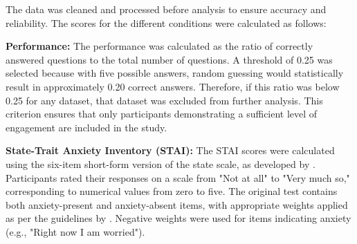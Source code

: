 The data was cleaned and processed before analysis to ensure accuracy and reliability. The scores for the different conditions were calculated as follows:

\begin{APAitemize}
\item \textbf{Performance:} The performance was calculated as the ratio of correctly answered questions to the total number of questions. A threshold of 0.25 was selected because with five possible answers, random guessing would statistically result in approximately 0.20 correct answers. Therefore, if this ratio was below 0.25 for any dataset, that dataset was excluded from further analysis. This criterion ensures that only participants demonstrating a sufficient level of engagement are included in the study.
\item \textbf{State-Trait Anxiety Inventory (STAI):} The STAI scores were calculated using the six-item short-form version of the state scale, as developed by \textcite{marteauDevelopmentSixitemShortform1992}. Participants rated their responses on a scale from "Not at all" to "Very much so," corresponding to numerical values from zero to five. The original test contains both anxiety-present and anxiety-absent items, with appropriate weights applied as per the guidelines by \textcite{marteauDevelopmentSixitemShortform1992}. Negative weights were used for items indicating anxiety (e.g., "Right now I am worried").
\end{APAitemize}